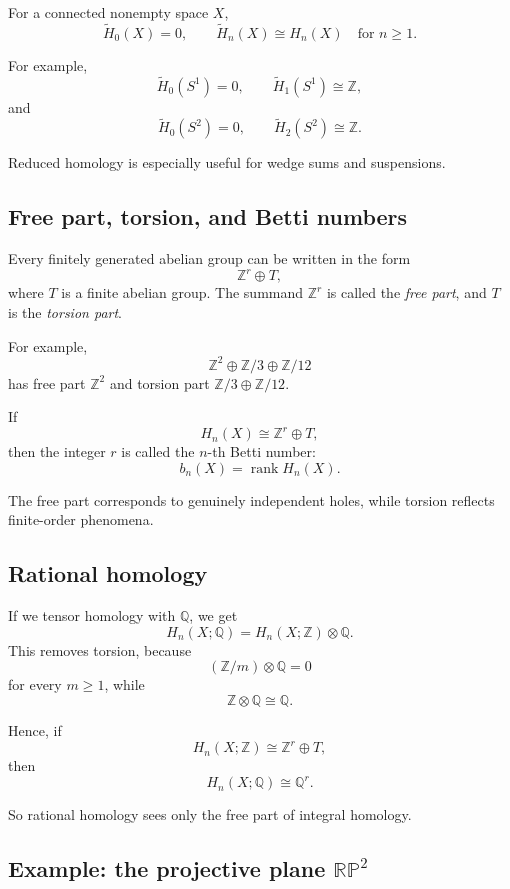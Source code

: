 \documentclass[12pt,a4paper]{article}
\theoremstyle{notespace}
\begin{document}
For a connected nonempty space \(X\),
\[
\widetilde{H}_0(X)=0,
\qquad
\widetilde{H}_n(X)\cong H_n(X)\quad \text{for } n\geq 1.
\]

For example,
\[
\widetilde{H}_0(S^1)=0,
\qquad
\widetilde{H}_1(S^1)\cong \mathbb{Z},
\]
and
\[
\widetilde{H}_0(S^2)=0,
\qquad
\widetilde{H}_2(S^2)\cong \mathbb{Z}.
\]

Reduced homology is especially useful for wedge sums and suspensions.

\subsection{Free part, torsion, and Betti numbers}

Every finitely generated abelian group can be written in the form
\[
\mathbb{Z}^r\oplus T,
\]
where \(T\) is a finite abelian group. The summand \(\mathbb{Z}^r\) is called the \emph{free part}, and \(T\) is the \emph{torsion part}.

For example,
\[
\mathbb{Z}^2\oplus \mathbb{Z}/3\oplus \mathbb{Z}/12
\]
has free part \(\mathbb{Z}^2\) and torsion part \(\mathbb{Z}/3\oplus \mathbb{Z}/12\).

If
\[
H_n(X)\cong \mathbb{Z}^r\oplus T,
\]
then the integer \(r\) is called the \(n\)-th Betti number:
\[
b_n(X)=\operatorname{rank} H_n(X).
\]

The free part corresponds to genuinely independent holes, while torsion reflects finite-order phenomena.

\subsection{Rational homology}

If we tensor homology with \(\mathbb{Q}\), we get
\[
H_n(X;\mathbb{Q})=H_n(X;\mathbb{Z})\otimes \mathbb{Q}.
\]
This removes torsion, because
\[
(\mathbb{Z}/m)\otimes \mathbb{Q}=0
\]
for every \(m\geq 1\), while
\[
\mathbb{Z}\otimes \mathbb{Q}\cong \mathbb{Q}.
\]

Hence, if
\[
H_n(X;\mathbb{Z})\cong \mathbb{Z}^r\oplus T,
\]
then
\[
H_n(X;\mathbb{Q})\cong \mathbb{Q}^r.
\]

So rational homology sees only the free part of integral homology.

\subsection{Example: the projective plane \(\mathbb{RP}^2\)}
\end{document}
